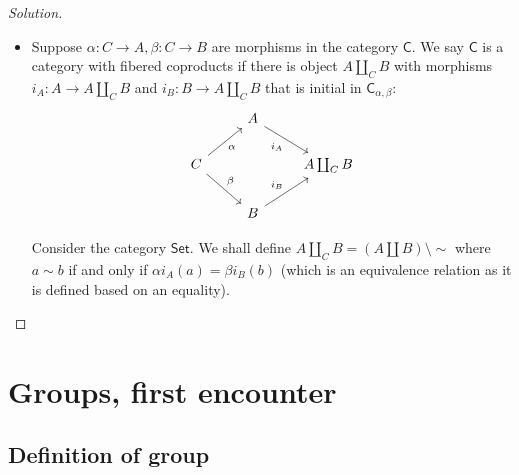 \documentclass{article}
\theoremstyle{definition}
\newenvironment{solution}{
	\begin{proof}[Solution]
		\vspace{-8px}
		\setlength{\parskip}{4px}
		\setlength{\parindent}{0px}
	}{
\end{proof}
}
\newcommand{\C}{\mathsf{C}}
\newcommand{\Cset}{\mathsf{Set}}
\begin{document}
\begin{solution}
\begin{itemize}
		\item Suppose $\alpha: C \to A, \beta: C \to B$ are morphisms in the category $\C$. We say $\C$ is a category with fibered coproducts if there is object $A \coprod_C B$ with morphisms $i_A : A \to A \coprod_C B$ and $i_B: B \to A \coprod_C B$ that is initial in $\C_{\alpha,\beta}$:
		\begin{equation*}
			\begin{tikzcd}
				& A \arrow[dr, "i_A" swap] &\\
				C
					\arrow[ur, "\alpha" swap]
					\arrow[dr, "\beta"]
					&
					& A \coprod_C B\\
				& B \arrow[ur, "i_B"] &
			\end{tikzcd}
		\end{equation*}
		
		Consider the category $\Cset$. We shall define $A \coprod_C B = (A \coprod B) \setminus \sim$ where $a \sim b$ if and only if $\alpha i_A(a) = \beta i_B(b)$ (which is an equivalence relation as it is defined based on an equality).
	\end{itemize}
\end{solution}

\section{Groups, first encounter}

\subsection{Definition of group}
\end{document}
